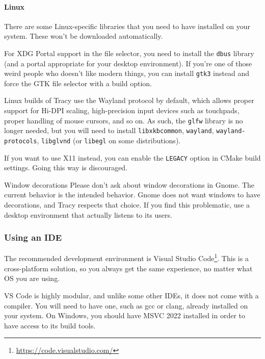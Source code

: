 \documentclass[hidelinks,titlepage,a4paper,twoside]{article}
\begin{document}
\paragraph{Linux}

There are some Linux-specific libraries that you need to have installed on your system. These won't be downloaded automatically.

For XDG Portal support in the file selector, you need to install the \texttt{dbus} library (and a portal appropriate for your desktop environment). If you're one of those weird people who doesn't like modern things, you can install \texttt{gtk3} instead and force the GTK file selector with a build option.

Linux builds of Tracy use the Wayland protocol by default, which allows proper support for Hi-DPI scaling, high-precision input devices such as touchpads, proper handling of mouse cursors, and so on. As such, the \texttt{glfw} library is no longer needed, but you will need to install \texttt{libxkbcommon}, \texttt{wayland}, \texttt{wayland-protocols}, \texttt{libglvnd} (or \texttt{libegl} on some distributions).

If you want to use X11 instead, you can enable the \texttt{LEGACY} option in CMake build settings. Going this way is discouraged.

\begin{bclogo}[
noborder=true,
couleur=black!5,
logo=\bcbombe
]{Window decorations}
Please don't ask about window decorations in Gnome. The current behavior is the intended behavior. Gnome does not want windows to have decorations, and Tracy respects that choice. If you find this problematic, use a desktop environment that actually listens to its users.
\end{bclogo}

\subsubsection{Using an IDE}

The recommended development environment is Visual Studio Code\footnote{\url{https://code.visualstudio.com/}}. This is a cross-platform solution, so you always get the same experience, no matter what OS you are using.

VS Code is highly modular, and unlike some other IDEs, it does not come with a compiler. You will need to have one, such as gcc or clang, already installed on your system. On Windows, you should have MSVC 2022 installed in order to have access to its build tools.
\end{document}

